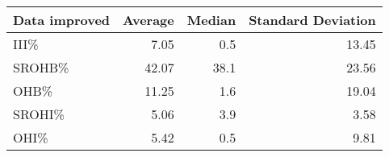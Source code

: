 \begin{tabular}{|l|r|rr}
\hline
 Data improved   &   Average &   Median &   Standard Deviation \\
\hline
 III\%            &      7.05 &      0.5 &                13.45 \\
\hline
 SROHB\%          &     42.07 &     38.1 &                23.56 \\
\hline
 OHB\%            &     11.25 &      1.6 &                19.04 \\
\hline
 SROHI\%          &      5.06 &      3.9 &                 3.58 \\
\hline
 OHI\%            &      5.42 &      0.5 &                 9.81 \\
\hline
\end{tabular}
